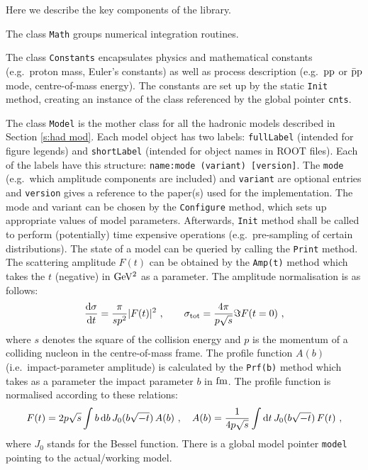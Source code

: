 \documentclass[preprint,12pt]{elsarticle}
\def\d{{\rm d}}
\begin{document}
Here we describe the key components of the library.

The class {\tt Math} groups numerical integration routines.

The class {\tt Constants} encapsulates physics and mathematical constants (e.g.~proton mass, Euler's constants) as well as process description (e.g.~$\rm pp$ or $\rm \bar pp$ mode, centre-of-mass energy). The constants are set up by the static {\tt Init} method, creating an instance of the class referenced by the global pointer {\tt cnts}.

The class {\tt Model} is the mother class for all the hadronic models described in Section \ref{s:had mod}. Each model object has two labels: {\tt fullLabel} (intended for figure legends) and {\tt shortLabel} (intended for object names in ROOT files). Each of the labels have this structure: {\tt name:mode (variant) [version]}. The {\tt mode} (e.g.~which amplitude components are included) and {\tt variant} are optional entries and {\tt version} gives a reference to the paper(s) used for the implementation. The mode and variant can be chosen by the {\tt Configure} method, which sets up appropriate values of model parameters. Afterwards, {\tt Init} method shall be called to perform (potentially) time expensive operations (e.g.~pre-sampling of certain distributions). The state of a model can be queried by calling the {\tt Print} method. The scattering amplitude $F(t)$ can be obtained by the {\tt Amp(t)} method which takes the $t$ (negative) in $\rm GeV^2$ as a parameter. The amplitude normalisation is as follows:
\begin{equation}
{\d\sigma\over\d t} = {\pi\over s p^2} |F(t)|^2\ ,\qquad \sigma_{\rm tot} = {4\pi\over p\sqrt s} \Im F(t = 0)\ ,
\end{equation}
where $s$ denotes the square of the collision energy and $p$ is the momentum of a colliding nucleon in the centre-of-mass frame. The profile function $A(b)$ (i.e.~impact-parameter amplitude) is calculated by the {\tt Prf(b)} method which takes as a parameter the impact parameter $b$ in $\rm fm$. The profile function is normalised according to these relations:
\begin{equation}
F(t) = 2 p \sqrt s \int b\, \d b\, J_0(b \sqrt{-t})\, A(b)\ ,\quad A(b) = {1\over 4p\sqrt s} \int \d t\, J_0(b\sqrt{-t})\,F(t)\ ,
\end{equation}
where $J_0$ stands for the Bessel function. There is a global model pointer {\tt model} pointing to the actual/working model.
\end{document}
